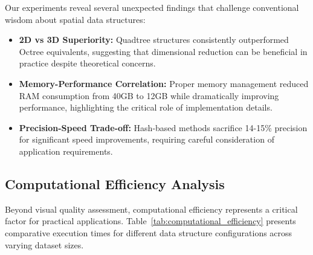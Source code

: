 \documentclass{sbc2023}
\begin{document}
Our experiments reveal several unexpected findings that challenge conventional wisdom about spatial data structures:

\begin{itemize}
    \item \textbf{2D vs 3D Superiority:} Quadtree structures consistently outperformed Octree equivalents, suggesting that dimensional reduction can be beneficial in practice despite theoretical concerns.
    \item \textbf{Memory-Performance Correlation:} Proper memory management reduced RAM consumption from 40GB to 12GB while dramatically improving performance, highlighting the critical role of implementation details.
    \item \textbf{Precision-Speed Trade-off:} Hash-based methods sacrifice 14-15\% precision for significant speed improvements, requiring careful consideration of application requirements.
\end{itemize}

\subsection{Computational Efficiency Analysis}

Beyond visual quality assessment, computational efficiency represents a critical factor for practical applications. Table~\ref{tab:computational_efficiency} presents comparative execution times for different data structure configurations across varying dataset sizes.
\end{document}
